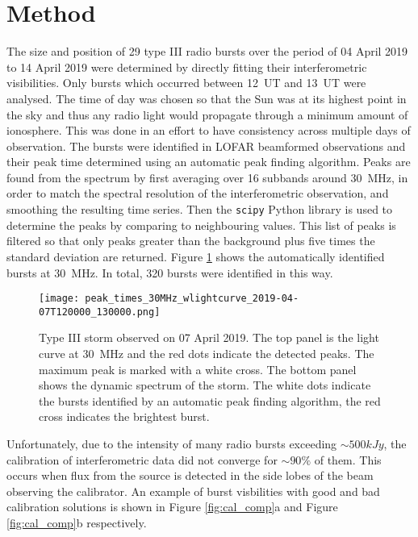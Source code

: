 \section{Method}
\label{sec:obsvtheory_method}
The size and position of 29 type III radio bursts over the period of 04 April 2019 to 14 April 2019 were determined by directly fitting their interferometric visibilities. Only bursts which occurred between 12~UT and 13~UT were analysed. The time of day was chosen so that the Sun was at its highest point in the sky and thus any radio light would propagate through a minimum amount of ionosphere. This was done in an effort to have consistency across multiple days of observation. The bursts were identified in LOFAR beamformed observations and their peak time determined using an automatic peak finding algorithm. Peaks are found from the spectrum by first averaging over 16 subbands around 30~MHz, in order to match the spectral resolution of the interferometric observation, and smoothing the resulting time series. Then the \texttt{scipy} Python library \citep{Virtanen2020} is used to determine the peaks by comparing to neighbouring values. This list of peaks is filtered so that only peaks greater than the background plus five times the standard deviation are returned.
Figure \ref{fig:dynamic_spectrum_070419} shows the automatically identified bursts at 30~MHz. In total, 320 bursts were identified in this way. 

\begin{figure}
\centering
\texttt{[image: peak\_times\_30MHz\_wlightcurve\_2019-04-07T120000\_130000.png]}
\caption[Type III storm observed on 07 April 2019.]{Type III storm observed on 07 April 2019. The top panel is the light curve at 30~MHz and the red dots indicate the detected peaks. The maximum peak is marked with a white cross. The bottom panel shows the dynamic spectrum of the storm. The white dots indicate the bursts identified by an automatic peak finding algorithm, the red cross indicates the brightest burst.}
\label{fig:dynamic_spectrum_070419}
\end{figure}

Unfortunately, due to the intensity of many radio bursts exceeding $\sim 500 kJy$, the calibration of interferometric data did not converge for $\sim 90 \%$ of them. This occurs when flux from the source is detected in the side lobes of the beam observing the calibrator. An example of burst visbilities with good and bad calibration solutions is shown in Figure \ref{fig:cal_comp}a and Figure \ref{fig:cal_comp}b respectively. 

